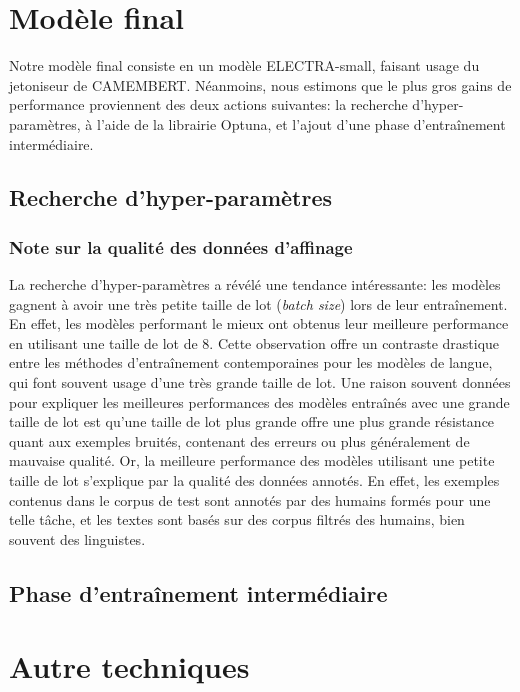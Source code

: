 \documentclass[12pt,twoside,maitrise]{dms}
\theoremstyle{definition}
\numberwithin{equation}{section}
\numberwithin{table}{chapter}
\numberwithin{figure}{chapter}
\begin{document}



\chapter{Modèle final}
Notre modèle final consiste en un modèle ELECTRA-small, faisant usage du
jetoniseur de CAMEMBERT. Néanmoins, nous estimons que le plus gros gains de
performance proviennent des deux actions suivantes: la recherche
d'hyper-paramètres, à l'aide de la librairie Optuna, et l'ajout d'une phase
d'entraînement intermédiaire. %
\section{Recherche d'hyper-paramètres}
\subsection{Note sur la qualité des données d'affinage}
La recherche d'hyper-paramètres a révélé une tendance intéressante: les modèles
gagnent à avoir une très petite taille de lot (\textit{batch size}) lors de
leur entraînement. En effet, les modèles performant le mieux ont obtenus leur
meilleure performance en utilisant une taille de lot de 8. Cette observation
offre un contraste drastique entre les méthodes d'entraînement contemporaines
pour les modèles de langue, qui font souvent usage d'une très grande taille de
lot. Une raison souvent données pour expliquer les meilleures performances des
modèles entraînés avec une grande taille de lot est qu'une taille de lot plus
grande offre une plus grande résistance quant aux exemples bruités, contenant
des erreurs ou plus généralement de mauvaise qualité. Or, la meilleure
performance des modèles utilisant une petite taille de lot s'explique par la
qualité des données annotés. En effet, les exemples contenus dans le corpus de
test sont annotés par des humains formés pour une telle tâche, et les textes
sont basés sur des corpus filtrés des humains, bien souvent des linguistes.
\section{Phase d'entraînement intermédiaire}
\chapter{Autre techniques} \label{chapitre:autretechnique}
\end{document}
